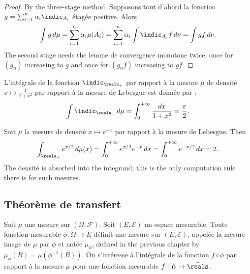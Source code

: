 \begin{proof}
  By the three-stage method. Supposons tout d'abord la fonction $g = \sum_{i=1}^{n}
  \alpha_{i} \indic_{A_{i}}$ étagée positive. Alors
  \[
    \int g \, d\mu = \sum_{i=1}^{n} \alpha_{i} \mu(A_{i})
    = \sum_{i=1}^{n} \alpha_{i} \int \indic_{A_{i}} f \, d\nu = \int g f \, d\nu .
  \]
  The second stage needs the lemme de convergence monotone twice, once for $(g_{n})$
  increasing to $g$ and once for $(g_{n} f)$ increasing to $gf$.
\end{proof}

\begin{example}
  L'intégrale de la fonction $\indic_{\reals_{+}}$ par rapport à la mesure $\mu$ de
  densité $x \mapsto \frac{1}{1+x^{2}}$ par rapport à la mesure de Lebesgue est
  donnée par :
  \[
    \int \indic_{\reals_{+}} \, d\mu = \int_{0}^{+\infty} \frac{dx}{1+x^{2}}
    = \frac{\pi}{2} .
  \]
\end{example}

\begin{example}
  Soit $\mu$ la mesure de densité $x \mapsto e^{-x}$ par rapport à la mesure de
  Lebesgue. Then
  \[
    \int_{\reals_{+}} e^{x/2} \, d\mu(x)
    = \int_{0}^{+\infty} e^{x/2} e^{-x} \, dx
    = \int_{0}^{+\infty} e^{-x/2} \, dx = 2 .
  \]
  The densité is absorbed into the integrand; this is the only computation rule
  there is for such mesures.
\end{example}

\subsection{Théorème de transfert}

Soit $\mu$ une mesure sur $(\Omega,\mathcal{F})$. Soit $(E,\mathcal{E})$ un espace
mesurable. Toute fonction mesurable $\phi : \Omega \to E$ définit une mesure sur
$(E,\mathcal{E})$, appelée la mesure image de $\mu$ par $\phi$ et notée
$\mu_{\phi}$, defined in the previous chapter by $\mu_{\phi}(B) =
\mu(\phi^{-1}(B))$. On s'intéresse à l'intégrale de la fonction $f \circ \phi$ par
rapport à la mesure $\mu$ pour une fonction mesurable $f : E \to \bar{\reals}$.

\begin{figure}[h!]
  \centering
\end{figure}

